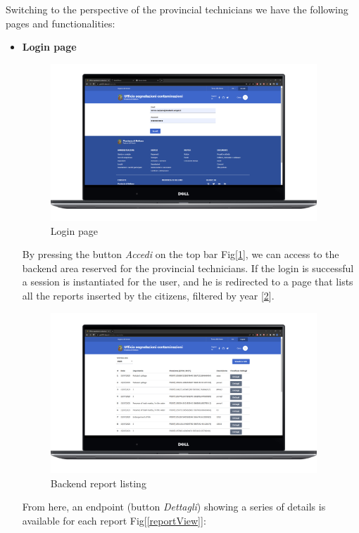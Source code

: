 \begin{itemize}
gure}[H] \centering \texttt{[image: img/tablet.png]} \caption{Tablet interface} \label{tablet} \end{figure}
\end{itemize} 
\pagebreak
Switching to the perspective of the provincial technicians we have the following pages and functionalities:
\begin{itemize}
    \item \textbf{Login page} \\
    \begin{figure}[H]\centering \includegraphics[width=27em]{img/login.png} \caption{Login page} \label{login} \end{figure}
    By pressing the button \textit{Accedi} on the top bar Fig[\ref{login}], we can access to the backend area reserved for the provincial technicians.
    If the login is successful a session is instantiated for the user, and he is redirected to a page that lists all the reports inserted by the citizens, filtered by year [\ref{backendListing}].
    \begin{figure}[H] \centering \includegraphics[width=27em]{img/home_back.png} \caption{Backend report listing} \label{backendListing}\end{figure}
    From here, an endpoint (button \textit{Dettagli}) showing a series of details is available for each report Fig[\ref{reportView}]:
    \begin{enumerate}

\end{enumerate}
\end{itemize}
